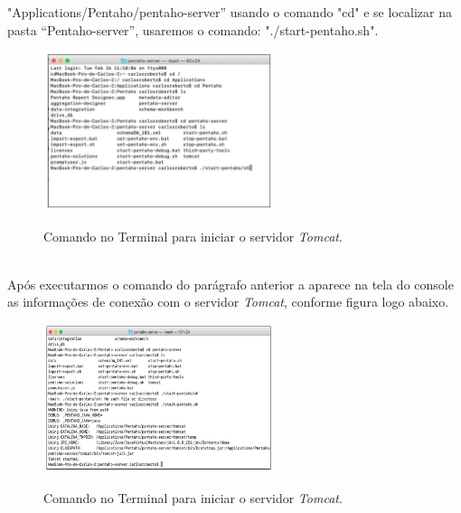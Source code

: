 "Applications/Pentaho/pentaho-server'' usando o comando "cd" e se localizar na pasta ``Pentaho-server'', usaremos o comando: "./start-pentaho.sh".

\begin{figure}[H]
	\vspace*{0,2cm}
    \centering
    \caption{Comando no Terminal para iniciar o servidor \textit{Tomcat}.}
    \includegraphics[width=0.6\textwidth]{./04-figuras/figura-pserver}
    \label{fig:ilustfigpserver}
\end{figure}
\vspace*{-0,9cm}
{\raggedright {}} \\

Ap\'os executarmos o comando do par\'{a}grafo anterior a aparece na tela do console as informa\c{c}\~{o}es de conex\~{a}o com o servidor \textit{Tomcat}, conforme figura logo abaixo.

\begin{figure}[H]
	\vspace*{0,2cm}
    \centering
    \caption{Comando no Terminal para iniciar o servidor \textit{Tomcat}.}
    \includegraphics[width=0.6\textwidth]{./04-figuras/figura-pserver-iniciando}
    \label{fig:ilustfigpserveriniciando}
\end{figure}
\vspace*{-0,9cm}
{\raggedright {}} \\

